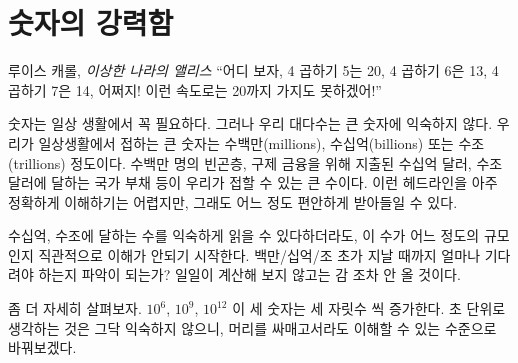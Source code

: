 \chapter{숫자의 강력함}
\label{les:15}

\begin{chapquote}{루이스 캐롤, \textit{이상한 나라의 앨리스}}
	\enquote{어디 보자, 
		4 곱하기 5는 20, 
		4 곱하기 6은 13, 
		4 곱하기 7은 14, 
		어쩌지! 이런 속도로는 20까지 가지도 못하겠어!}
\end{chapquote}

\begin{comment}
	Numbers are an essential part of our everyday life. Large numbers,
	however, aren't something most of us are too familiar with. The largest
	numbers we might encounter in everyday life are in the range of
	millions, billions, or trillions. We might read about millions of people
	in poverty, billions of dollars spent on bank bailouts, and trillions of
	national debt. Even though it's hard to make sense of these headlines,
	we are somewhat comfortable with the size of those numbers.
\end{comment}
숫자는 일상 생활에서 꼭 필요하다. 
그러나 우리 대다수는 큰 숫자에 익숙하지 않다. 
우리가 일상생활에서 접하는 큰 숫자는 수백만(millions), 수십억(billions) 또는 수조(trillions) 정도이다.
수백만 명의 빈곤층, 구제 금융을 위해 지출된 수십억 달러, 수조 달러에 달하는 국가 부채 등이 우리가 접할 수 있는 큰 수이다.
이런 헤드라인을 아주 정확하게 이해하기는 어렵지만, 그래도 어느 정도 편안하게 받아들일 수 있다.

\begin{comment}
	Although we might seem comfortable with billions and trillions, our
	intuition already starts to fail with numbers of this magnitude. Do you
	have an intuition how long you would have to wait for a
	million/billion/trillion seconds to pass? If you are anything like me,
	you are lost without actually crunching the numbers.
\end{comment}
수십억, 수조에 달하는 수를 익숙하게 읽을 수 있다하더라도, 이 수가 어느 정도의 규모인지 직관적으로 이해가 안되기 시작한다.
백만/십억/조 초가 지날 때까지 얼마나 기다려야 하는지 파악이 되는가?
일일이 계산해 보지 않고는 감 조차 안 올 것이다. 

\begin{comment}
	Let's take a closer look at this example: the difference between each is an
	increase by three orders of magnitude: $10^6$, $10^9$, $10^{12}$. Thinking about
	seconds is not very useful, so let's translate this into something we can wrap
	our head around:
\end{comment}
좀 더 자세히 살펴보자. $10^6$, $10^9$, $10^{12}$ 이 세 숫자는 세 자릿수 씩 증가한다.  
초 단위로 생각하는 것은 그닥 익숙하지 않으니, 머리를 싸매고서라도 이해할 수 있는 수준으로 바꿔보겠다.

